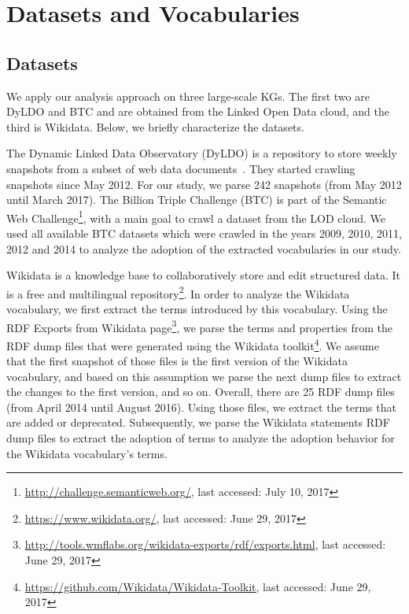 \section{Datasets and Vocabularies}\label{Dataset}
\subsection{Datasets}
We apply our analysis approach on three large-scale KGs.
The first two are DyLDO and BTC and are obtained from the Linked Open Data cloud, and the third is Wikidata.
Below, we briefly characterize the datasets.

The Dynamic Linked Data Observatory (DyLDO) is a repository to store weekly snapshots from a subset of web data documents~\cite{kafer2012towards}. 
They started crawling snapshots since May 2012. For our study, we parse 242 snapshots (from May 2012 until March 2017). 
%
The Billion Triple Challenge (BTC) is part of the Semantic Web Challenge\footnote{\url{http://challenge.semanticweb.org/}, last accessed: July 10, 2017}, with a main goal to crawl a dataset from the LOD cloud. 
We used all available BTC datasets which were crawled in the years 2009, 2010, 2011, 2012 and 2014 to analyze the adoption of the extracted vocabularies in our study.

Wikidata is a knowledge base to collaboratively store and edit structured data. 
It is a free and multilingual repository\footnote{\url{https://www.wikidata.org/}, last accessed: June 29, 2017}.
In order to analyze the Wikidata vocabulary, we first extract the terms introduced by this vocabulary. 
Using the RDF Exports from Wikidata page\footnote{\url{http://tools.wmflabs.org/wikidata-exports/rdf/exports.html}, last accessed: June 29, 2017}, we parse the terms and properties from the RDF dump files that were generated using the Wikidata toolkit\footnote{\url{https://github.com/Wikidata/Wikidata-Toolkit}, last accessed: June 29, 2017}. 
We assume that the first snapshot of those files is the first version of the Wikidata vocabulary, and based on this assumption we parse the next dump files to extract the changes to the first version, and so on.
Overall, there are 25 RDF dump files (from  April 2014 until August 2016). 
Using those files, we extract the terms that are added or deprecated. 
Subsequently, we parse the Wikidata statements RDF dump files to extract the adoption of terms to analyze the adoption behavior for the Wikidata vocabulary's terms.

